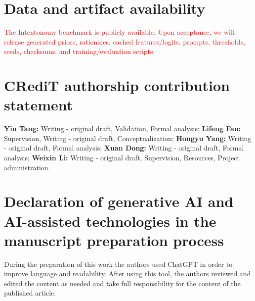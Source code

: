 \documentclass[times,review,10pt]{elsarticle}
\newcommand{\revised}[1]{\textcolor{red}{#1}}
\begin{document}









\section*{Data and artifact availability}
\revised{The Intentonomy benchmark is publicly available. Upon acceptance, we will release generated priors, rationales, cached features/logits, prompts, thresholds, seeds, checksums, and training/evaluation scripts.}

\section*{CRediT authorship contribution statement}
\textbf{Yin Tang:} Writing - original draft, Validation, Formal analysis; \textbf{Lifeng Fan:} Supervision, Writing - original draft, Conceptualization; \textbf{Hongyu Yang:} Writing - original draft, Formal analysis; \textbf{Xuan Dong:} Writing - original draft, Formal analysis; \textbf{Weixin Li:} Writing - original draft, Supervision, Resources, Project administration.


\section*{Declaration of generative AI and AI-assisted technologies in the manuscript preparation process}
During the preparation of this work the authors used ChatGPT in order to improve language and readability. After using this tool, the authors reviewed and edited the content as needed and take full responsibility for the content of the published article.
















\end{document}
